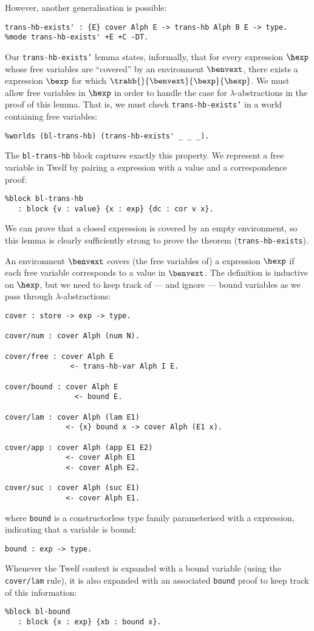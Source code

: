However, another generalisation is possible:
\begin{verbatim}
trans-hb-exists' : {E} cover Alph E -> trans-hb Alph B E -> type.
%mode trans-hb-exists' +E +C -DT.
\end{verbatim}
Our \texttt{trans-hb-exists'} lemma states, informally, that for every \hlang expression $\hexp$ whose free variables are ``covered'' by an environment $\benvext$, there exists a \blang expression $\bexp$ for which $\trahb{}{\benvext}{\bexp}{\hexp}$.
We must allow free variables in $\hexp$ in order to handle the case for $\lambda$-abstractions in the proof of this lemma.
That is, we must check \texttt{trans-hb-exists'} in a world containing free variables:
\begin{verbatim}
%worlds (bl-trans-hb) (trans-hb-exists' _ _ _).
\end{verbatim}
The \texttt{bl-trans-hb} block captures exactly this property.
We represent a free variable in Twelf by pairing a \hlang expression with a \blang value and a correspondence proof:
\begin{verbatim}
%block bl-trans-hb
   : block {v : value} {x : exp} {dc : cor v x}.
\end{verbatim}
We can prove that a closed expression is covered by an empty environment, so this lemma is clearly sufficiently strong to prove the theorem (\texttt{trans-hb-exists}).

An environment $\benvext$ covers (the free variables of) a \hlang expression $\hexp$ if each free variable corresponds to a \blang value in $\benvext$.
The definition is inductive on $\hexp$, but we need to keep track of --- and ignore --- bound variables as we pass through $\lambda$-abstractions:
\begin{verbatim}
cover : store -> exp -> type.

cover/num : cover Alph (num N).

cover/free : cover Alph E
               <- trans-hb-var Alph I E.

cover/bound : cover Alph E
                <- bound E.

cover/lam : cover Alph (lam E1)
              <- {x} bound x -> cover Alph (E1 x).

cover/app : cover Alph (app E1 E2)
              <- cover Alph E1
              <- cover Alph E2.

cover/suc : cover Alph (suc E1)
              <- cover Alph E1.
\end{verbatim}
where \texttt{bound} is a constructorless type family parameterised with a \hlang expression, indicating that a variable is bound:
\begin{verbatim}
bound : exp -> type.
\end{verbatim}
Whenever the Twelf context is expanded with a bound variable (using the \texttt{cover/lam} rule), it is also expanded with an associated \texttt{bound} proof to keep track of this information:
\begin{verbatim}
%block bl-bound
   : block {x : exp} {xb : bound x}.
\end{verbatim}

